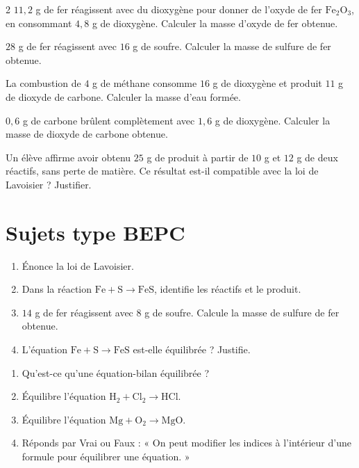 \begin{multicols}{2}
\exo{} $11{,}2$ g de fer réagissent avec du dioxygène pour donner de l'oxyde de
fer $\mathrm{Fe_2O_3}$, en consommant $4{,}8$ g de dioxygène. Calculer la masse d'oxyde de
fer obtenue.

\exo{} $28$ g de fer réagissent avec $16$ g de soufre. Calculer la masse de
sulfure de fer obtenue.

\exo{} La combustion de $4$ g de méthane consomme $16$ g de dioxygène et produit
$11$ g de dioxyde de carbone. Calculer la masse d'eau formée.

\exo{} $0{,}6$ g de carbone brûlent complètement avec $1{,}6$ g de dioxygène.
Calculer la masse de dioxyde de carbone obtenue.

\exo{} Un élève affirme avoir obtenu $25$ g de produit à partir de $10$ g et $12$
g de deux réactifs, sans perte de matière. Ce résultat est-il compatible avec la loi de
Lavoisier ? Justifier.

\end{multicols}

\section{Sujets type BEPC}

\begin{enumerate}[label=\arabic*)]
\item Énonce la loi de Lavoisier.
\item Dans la réaction $\mathrm{Fe}+\mathrm{S}\to\mathrm{FeS}$, identifie les réactifs et
le produit.
\item $14$ g de fer réagissent avec $8$ g de soufre. Calcule la masse de sulfure de fer
obtenue.
\item L'équation $\mathrm{Fe}+\mathrm{S}\to\mathrm{FeS}$ est-elle équilibrée ? Justifie.
\end{enumerate}

\begin{enumerate}[label=\arabic*)]
\item Qu'est-ce qu'une équation-bilan équilibrée ?
\item Équilibre l'équation $\mathrm{H_2}+\mathrm{Cl_2}\to\mathrm{HCl}$.
\item Équilibre l'équation $\mathrm{Mg}+\mathrm{O_2}\to\mathrm{MgO}$.
\item Réponds par Vrai ou Faux : « On peut modifier les indices à l'intérieur d'une formule
pour équilibrer une équation. »
\end{enumerate}

